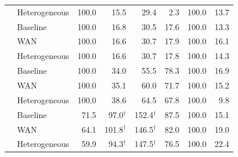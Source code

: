 \begin{table}[t]
\begin{tabular}{@{}llrrrrrr@{}}
 & Heterogeneous & 100.0 & 15.5 & 29.4 & 2.3 & 100.0 & 13.7 \\
\addlinespace[2pt]
64 & Baseline & 100.0 & 16.8 & 30.5 & 17.6 & 100.0 & 13.3 \\
 & WAN & 100.0 & 16.6 & 30.7 & 17.9 & 100.0 & 16.1 \\
 & Heterogeneous & 100.0 & 16.6 & 30.7 & 17.8 & 100.0 & 14.3 \\
\addlinespace[2pt]
512 & Baseline & 100.0 & 34.0 & 55.5 & 78.3 & 100.0 & 16.9 \\
 & WAN & 100.0 & 35.1 & 60.0 & 71.7 & 100.0 & 15.2 \\
 & Heterogeneous & 100.0 & 38.6 & 64.5 & 67.8 & 100.0 & 9.8 \\
\addlinespace[2pt]
2048 & Baseline & 71.5 & 97.0$^\dagger$ & 152.4$^\dagger$ & 87.5 & 100.0 & 15.1 \\
 & WAN & 64.1 & 101.8$^\dagger$ & 146.5$^\dagger$ & 82.0 & 100.0 & 19.0 \\
 & Heterogeneous & 59.9 & 94.3$^\dagger$ & 147.5$^\dagger$ & 76.5 & 100.0 & 22.4 \\
\bottomrule
\end{tabular}
\end{table}